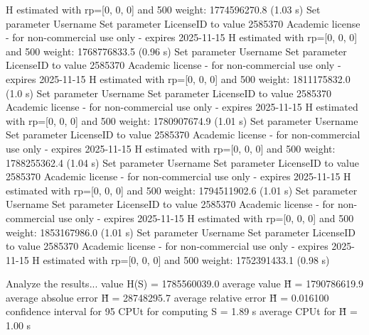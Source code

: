   H estimated with rp=[0, 0, 0] and 500 weight:  1774596270.8  (1.03 s)
Set parameter Username
Set parameter LicenseID to value 2585370
Academic license - for non-commercial use only - expires 2025-11-15
  H estimated with rp=[0, 0, 0] and 500 weight:  1768776833.5  (0.96 s)
Set parameter Username
Set parameter LicenseID to value 2585370
Academic license - for non-commercial use only - expires 2025-11-15
  H estimated with rp=[0, 0, 0] and 500 weight:  1811175832.0  (1.0 s)
Set parameter Username
Set parameter LicenseID to value 2585370
Academic license - for non-commercial use only - expires 2025-11-15
  H estimated with rp=[0, 0, 0] and 500 weight:  1780907674.9  (1.01 s)
Set parameter Username
Set parameter LicenseID to value 2585370
Academic license - for non-commercial use only - expires 2025-11-15
  H estimated with rp=[0, 0, 0] and 500 weight:  1788255362.4  (1.04 s)
Set parameter Username
Set parameter LicenseID to value 2585370
Academic license - for non-commercial use only - expires 2025-11-15
  H estimated with rp=[0, 0, 0] and 500 weight:  1794511902.6  (1.01 s)
Set parameter Username
Set parameter LicenseID to value 2585370
Academic license - for non-commercial use only - expires 2025-11-15
  H estimated with rp=[0, 0, 0] and 500 weight:  1853167986.0  (1.01 s)
Set parameter Username
Set parameter LicenseID to value 2585370
Academic license - for non-commercial use only - expires 2025-11-15
  H estimated with rp=[0, 0, 0] and 500 weight:  1752391433.1  (0.98 s)

Analyze the results...
  value H(S)                  = 1785560039.0 
  average value H̃             = 1790786619.9 
  average absolue error H̃     = 28748295.7 
  average relative error H̃    = 0.016100 
  confidence interval for 95%
  CPUt for computing S         = 1.89 s
  average CPUt for H̃           = 1.00 s

